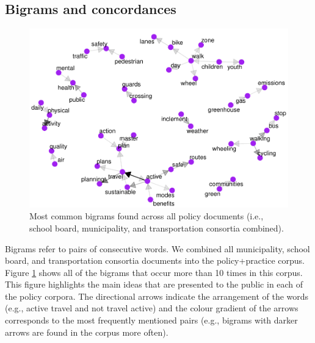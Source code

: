 \documentclass[preprint, 3p,
authoryear]{elsarticle} %
\begin{document}
\hypertarget{bigrams-and-concordances}{%
\subsection{Bigrams and concordances}\label{bigrams-and-concordances}}

\begin{figure}

{\centering \includegraphics[width=1\linewidth]{AST-Framing-Ontario_files/figure-latex/policy-visual-1} 

}

\caption{\label{fig:policy-visual}Most common bigrams found across all policy documents (i.e., school board, municipality, and transportation consortia combined).}\label{fig:policy-visual}
\end{figure}

Bigrams refer to pairs of consecutive words. We combined all
municipality, school board, and transportation consortia documents into
the policy+practice corpus. Figure \ref{fig:policy-visual} shows all of
the bigrams that occur more than 10 times in this corpus. This figure
highlights the main ideas that are presented to the public in each of
the policy corpora. The directional arrows indicate the arrangement of
the words (e.g., active travel and not travel active) and the colour
gradient of the arrows corresponds to the most frequently mentioned
pairs (e.g., bigrams with darker arrows are found in the corpus more
often).
\end{document}

